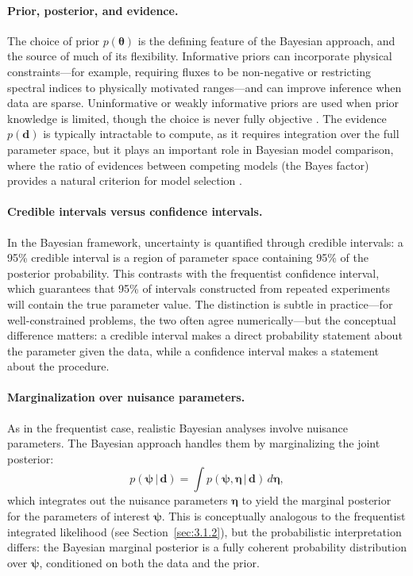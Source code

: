 \paragraph{Prior, posterior, and evidence.}

The choice of prior $p(\boldsymbol{\theta})$ is the defining feature of the Bayesian approach, and the source of much of its flexibility. Informative priors can incorporate physical constraints---for example, requiring fluxes to be non-negative or restricting spectral indices to physically motivated ranges---and can improve inference when data are sparse. Uninformative or weakly informative priors are used when prior knowledge is limited, though the choice is never fully objective \cite{Hastie:2009}. The evidence $p(\mathbf{d})$ is typically intractable to compute, as it requires integration over the full parameter space, but it plays an important role in Bayesian model comparison, where the ratio of evidences between competing models (the Bayes factor) provides a natural criterion for model selection \cite{Kass:1995}.

\paragraph{Credible intervals versus confidence intervals.}

In the Bayesian framework, uncertainty is quantified through credible intervals: a 95\% credible interval is a region of parameter space containing 95\% of the posterior probability. This contrasts with the frequentist confidence interval, which guarantees that 95\% of intervals constructed from repeated experiments will contain the true parameter value. The distinction is subtle in practice---for well-constrained problems, the two often agree numerically---but the conceptual difference matters: a credible interval makes a direct probability statement about the parameter given the data, while a confidence interval makes a statement about the procedure.

\paragraph{Marginalization over nuisance parameters.}

As in the frequentist case, realistic Bayesian analyses involve nuisance parameters. The Bayesian approach handles them by marginalizing the joint posterior:
\begin{equation}
p(\boldsymbol{\psi} \,|\, \mathbf{d}) = \int p(\boldsymbol{\psi}, \boldsymbol{\eta} \,|\, \mathbf{d}) \, d\boldsymbol{\eta},
\label{eq:bayesian_marginalization}
\end{equation}
which integrates out the nuisance parameters $\boldsymbol{\eta}$ to yield the marginal posterior for the parameters of interest $\boldsymbol{\psi}$. This is conceptually analogous to the frequentist integrated likelihood (see Section~\ref{sec:3.1.2}), but the probabilistic interpretation differs: the Bayesian marginal posterior is a fully coherent probability distribution over $\boldsymbol{\psi}$, conditioned on both the data and the prior.

